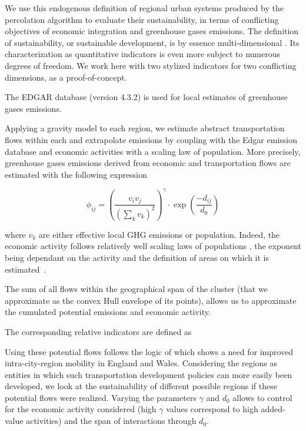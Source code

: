 \documentclass{jimis-en}
\begin{document}
We use this endogenous definition of regional urban systems produced by the percolation algorithm to evaluate their sustainability, in terms of conflicting objectives of economic integration and greenhouse gases emissions. The definition of sustainability, or sustainable development, is by essence multi-dimensional \citep{viguie2012trade}. Its characterization as quantitative indicators is even more subject to numerous degrees of freedom. We work here with two stylized indicators for two conflicting dimensions, as a proof-of-concept.


The EDGAR database \citep{janssens2017edgar} (version 4.3.2) is used for local estimates of greenhouse gases emissions.



Applying a gravity model to each region, we estimate abstract transportation flows within each and extrapolate emissions by coupling with the Edgar emission database \citep{janssens2017edgar} and economic activities with a scaling law of population.  More precisely, greenhouse gases emissions derived from economic and transportation flows are estimated with the following expression 

\begin{equation}
\phi_{ij} = \left(\frac{v_i v_j}{(\sum_k v_k)^2}\right)^\gamma \cdot \exp\left(\frac{-d_{ij}}{d_0}\right)
\end{equation}

where $v_k$ are either effective local GHG emissions or population. Indeed, the economic activity follows relatively well scaling laws of populations \cite{bettencourt2007growth}, the exponent being dependant on the activity and the definition of areas on which it is estimated~\citep{cottineau2017diverse}.


The sum of all flows within the geographical span of the cluster (that we approximate as the convex Hull envelope of its points), allows us to approximate the cumulated potential emissions and economic activity.


The corresponding relative indicators are defined as


Using these potential flows follows the logic of \cite{arbabi2019development} which shows a need for improved intra-city-region mobility in England and Wales. Considering the regions as entities in which such transportation development policies can more easily been developed, we look at the sustainability of different possible regions if these potential flows were realized. Varying the parameters $\gamma$ and $d_0$ allows to control for the economic activity considered (high $\gamma$ values correspond to high added-value activities) and the span of interactions through $d_0$.
\end{document}
